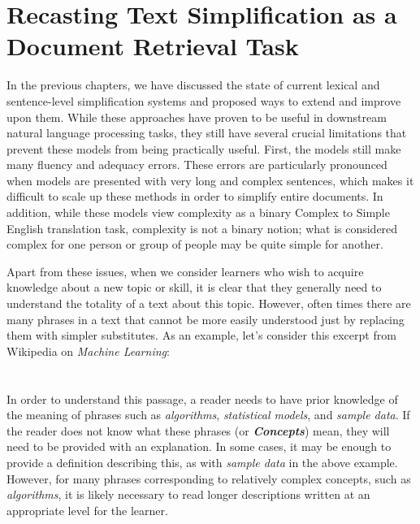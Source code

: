 \documentclass[thesis.tex]{subfiles}
\begin{document}
\chapter{Recasting Text Simplification as a Document Retrieval Task}
\label{chap:retrieval}

In the previous chapters, we have discussed the state of current lexical and sentence-level simplification systems and proposed ways to extend and improve upon them. While these approaches have proven to be useful in downstream natural language processing tasks, they still have several crucial limitations that prevent these models from being practically useful. First, the models still make many fluency and adequacy errors. These errors are particularly pronounced when models are presented with very long and complex sentences, which makes it difficult to scale up these methods in order to simplify entire documents. In addition, while these models view complexity as a binary Complex to Simple English translation task, complexity is not a binary notion; what is considered complex for one person or group of people may be quite simple for another.

Apart from these issues, when we consider learners who wish to acquire knowledge about a new topic or skill, it is clear that they generally need to understand the totality of a text about this topic. However, often times there are many phrases in a text that cannot be more easily understood just by replacing them with simpler substitutes. As an example, let's consider this excerpt from Wikipedia on \textit{Machine Learning}: \\

\noindent{} \\\\

In order to understand this passage, a reader needs to have prior knowledge of the meaning of phrases such as \textit{algorithms}, \textit{statistical models}, and \textit{sample data}. If the reader does not know what these phrases (or \textbf{\textit{Concepts}}) mean, they will need to be provided with an explanation. In some cases, it may be enough to provide a definition describing this, as with \textit{sample data} in the above example. However, for many phrases corresponding to relatively complex concepts, such as \textit{algorithms}, it is likely necessary to read longer descriptions written at an appropriate level for the learner.
\end{document}

